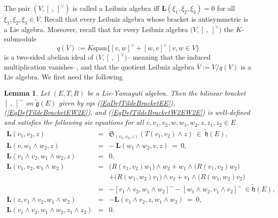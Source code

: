 \documentclass [11pt] {article}
\newtheorem {lemma} {Lemma}
\theoremstyle{definition}
\begin{document}
The pair $(V,[~,~]^\vee)$ is called a Leibniz algebra iff
$\mathbf{L}(\xi_1,\xi_2,\xi_3)=0$ for all
$\xi_1,\xi_2,\xi_3\in V$. Recall that every Leibniz algebra whose bracket is antisymmetric is a Lie algebra. Moreover, recall that for every Leibniz algebra $\big(V,[~,~]^\vee\big)$ the $K$-submodule
\begin{equation}\label{EqDefLeibnizQuadraticIdeal}
  q(V)
   :=K\mathrm{span}\big\{[v,w]^\vee+[w,v]^\vee~|~
   v,w\in V\big\}
\end{equation}
is a two-sided abelian ideal of $\big(V,[~,~]^\vee\big)$--
meaning that the induced multiplication vanishes--,
and that the quotient Leibniz algebra 
$\overline{V}:=V/q(V)$ is a Lie algebra.
We first need the following
\begin{lemma}\label{LFELeibnizProperties}
	Let $(E,T,R)$ be a Lie-Yamaguti algebra. Then the
	bilinear bracket $[~,~]^\sim$ on $\tilde{\mathfrak{g}}(E)$ given by eqs (\ref{EqDefTildeBracketEE}),
	(\ref{EqDefTildeBracketEW2E}), and
	(\ref{EqDefTildeBracketW2EW2E}) is well-defined and 
	satisfies the following six equations for all
	$v,v_1,v_2,w,w_1,w_2,z,z_1,z_2\in E$
	\begin{eqnarray}
	 \mathbf{L}(v_1,v_2,z)& = &
	     \mathfrak{S}_{(v_1,v_2,z)}
	        \left(T(v_1,v_2)\wedge z\right)~\in~
	           \tilde{\mathfrak{h}}(E),
	           \label{EqCompLeibnizMMM} \\
	 \mathbf{L}(v,w_1\wedge w_2, z)
	 &= & -~\mathbf{L}(w_1\wedge w_2,v,z)~=~0,
	 \label{EqCompLeibnizMHM}\\
	 \mathbf{L}(v_1\wedge v_2,w_1\wedge w_2, z)
	 & = & 0,
	 \label{EqCompLeibnizHHM}\\
	 \mathbf{L}(v_1, v_2,w_1\wedge w_2) & = &
	    \big(R(v_1,v_2)w_1\big)\wedge w_2
	    +w_1\wedge \big(R(v_1,v_2)w_2\big)\nonumber \\
	& &    +\big(R(w_1,w_2)v_1\big)\wedge v_2
	    +v_1\wedge \big(R(w_1,w_2)v_2\big)\nonumber \\
	& = &  -[v_1\wedge v_2,w_1\wedge w_2]^\sim
	        -[w_1\wedge w_2,v_1\wedge v_2]^\sim
	        ~\in \tilde{\mathfrak{h}}(E),
	      \label{EqCompLeibnizMMH} \\
	 \mathbf{L}(z,v_1\wedge v_2,w_1\wedge w_2) & = & 
	 -\mathbf{L}(v_1\wedge v_2,z,w_1\wedge w_2)~=~0,
	   \label{EqCompLeibnizMHH}\\
	 \mathbf{L}(v_1\wedge v_2,w_1\wedge w_2,z_1\wedge z_2) 
	     & = & 0.
	    \label{EqCompLeibnizHHH} 
	\end{eqnarray}
\end{lemma}
\end{document}
